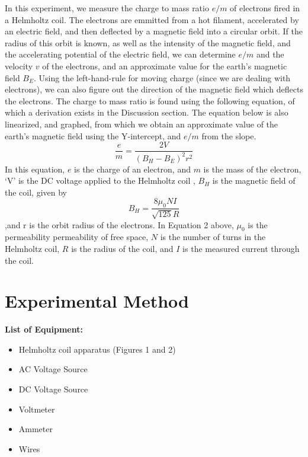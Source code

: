\documentclass[letterpaper]{article}
\begin{document}
In this experiment, we measure the charge to mass ratio $e/m$ of electrons fired in a
Helmholtz coil.
The electrons are emmitted from a hot filament, accelerated by an electric field, and then deflected
by a magnetic field into a circular orbit. If the radius of this orbit is known,
as well as the intensity of the magnetic field, and the accelerating potential of the
electric field, we can determine $e/m$ and the velocity $v$ of the electrons, and an approximate value for
the earth's magnetic field $B_E$. Using the left-hand-rule for moving charge (since we are
dealing with electrons), we can also figure out the direction of the magnetic field which deflects the electrons.
The charge to mass ratio is found using the following equation, of which a derivation exists in the Discussion section.
The equation below is also linearized, and graphed, from which we obtain an approximate value of the earth's magnetic field using the
Y-intercept, and $e/m$ from the slope.
\begin{equation}
  \frac{e}{m} = \frac{2V}{(B_H-B_E)^2r^2}
\end{equation}
In this equation, $e$ is the charge of an electron, and $m$ is the mass of the electron, `V' is the DC voltage applied to the Helmholtz coil
, $B_H$ is the magnetic field of the coil, given by
\begin{equation}
  B_H=\frac{8\mu_0 NI}{ \sqrt{125} R}
\end{equation}
,and r is the orbit radius of the electrons. In Equation 2 above, $\mu_0$ is the permeability permeability of free space,
$N$ is the number of turns in the Helmholtz coil, $R$ is the radius of the coil, and $I$ is the measured current through the
coil.

\section{Experimental Method}

\textbf{List of Equipment:}
\begin{itemize}
  \item Helmholtz coil apparatus (Figures 1 and 2)
  \item AC Voltage Source
  \item DC Voltage Source
  \item Voltmeter
  \item Ammeter
  \item Wires
\end{itemize}
\end{document}
